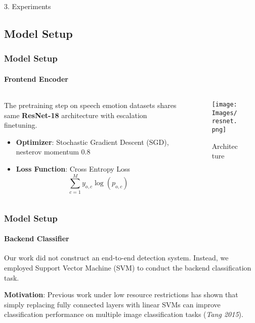 \documentclass[
	11pt, %
]{beamer}
\begin{document}
\begin{frame}
\begin{center}
    
    \Huge 3. Experiments
\end{center}
    
\end{frame}

\subsection{Model Setup}
\begin{frame}
	\frametitle{Model Setup}
	\framesubtitle{Frontend Encoder}
	
    \begin{columns}
        \begin{column}{0.6\textwidth}
            The pretraining step on speech emotion datasets shares same \textbf{ResNet-18} architecture with escalation finetuning. 
            \begin{itemize}
                \item \textbf{Optimizer}: Stochastic Gradient Descent (SGD), nesterov momentum 0.8
                \item \textbf{Loss Function}: Cross Entropy Loss
                $$\sum_{c=1}^My_{o,c}\log(p_{o,c})$$
            \end{itemize}
        \end{column}
        \begin{column}{0.4\textwidth}
	        \begin{figure}
	            \centering
	            \texttt{[image: Images/resnet.png]}
	            \caption{Architecture}
	            \label{fig:sbert}
	        \end{figure}
	    \end{column}
    \end{columns}
    \smallskip
	
\end{frame}



\begin{frame}
\frametitle{Model Setup}
\framesubtitle{Backend Classifier}

    Our work did not construct an end-to-end detection system. Instead, we employed Support Vector Machine (SVM) to conduct the backend classification task. 
    \smallskip
    
    \textbf{Motivation}: Previous work under low resource restrictions has shown that simply replacing fully connected layers with linear SVMs can improve classification performance on multiple image classification tasks (\emph{Tang 2015}).

    
\end{frame}
\end{document}
